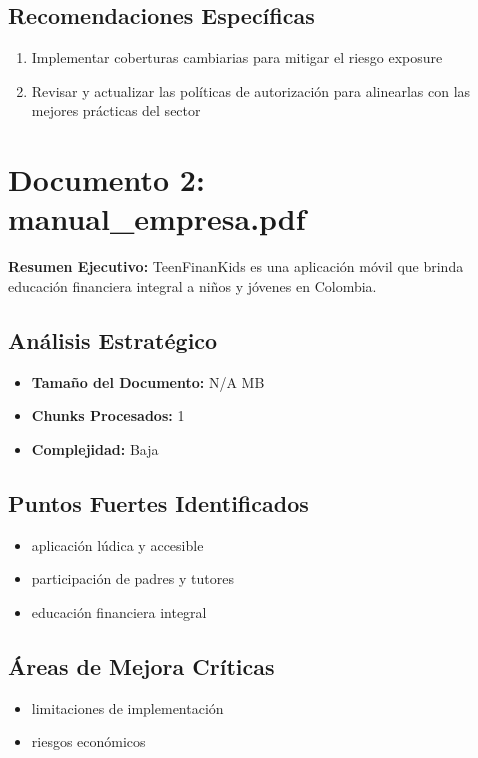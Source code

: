 \documentclass[11pt]{report}
\begin{document}
\subsection{Recomendaciones Específicas}
\begin{enumerate}
    \item Implementar coberturas cambiarias para mitigar el riesgo exposure
    \item Revisar y actualizar las políticas de autorización para alinearlas con las mejores prácticas del sector
\end{enumerate}


\section{Documento 2: manual_empresa.pdf}

\begin{tcolorbox}[colback=success-green!10!white, colframe=success-green, title=Evaluación de Riesgo: BAJO]
\textbf{Resumen Ejecutivo:} TeenFinanKids es una aplicación móvil que brinda educación financiera integral a niños y jóvenes en Colombia.
\end{tcolorbox}

\subsection{Análisis Estratégico}
\begin{itemize}
    \item \textbf{Tamaño del Documento:} N/A MB
    \item \textbf{Chunks Procesados:} 1
    \item \textbf{Complejidad:} Baja
\end{itemize}

\subsection{Puntos Fuertes Identificados}
\begin{itemize}
    \item aplicación lúdica y accesible
    \item participación de padres y tutores
    \item educación financiera integral
\end{itemize}

\subsection{Áreas de Mejora Críticas}
\begin{itemize}
    \item limitaciones de implementación
    \item riesgos económicos
\end{itemize}
\end{document}
